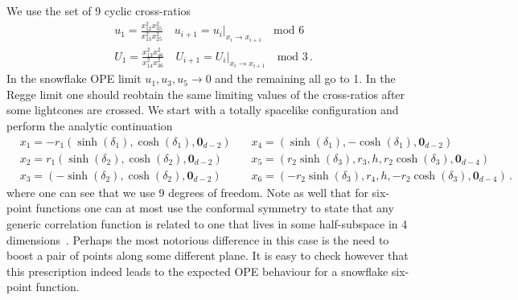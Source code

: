 We use the set of 9 cyclic cross-ratios
\begin{align}
   & u_1=\frac{x_{12}^2 x_{35}^2}{x_{13}^2 x_{25}^2} \quad u_{i+1}=u_i\vert_{x_i\to x_{i+1}} \quad \text{mod 6}\,\nonumber \\
   & U_1=\frac{x_{13}^2 x_{46}^2}{x_{14}^2 x_{36}^2}\quad U_{i+1}=U_i\vert_{x_i\to x_{i+1}} \quad \text{mod 3}\,.
\end{align}
In the snowflake OPE limit $u_1, u_3, u_5 \to 0$ and the remaining all go to 1. In the Regge limit one should reobtain the same limiting values of the cross-ratios after some lightcones are crossed. We start with a totally spacelike configuration and perform the analytic continuation
\begin{align}
  \label{eq:analyticcont6pt}
   & x_{1}= -r_1\left(\sinh(\delta_1),\cosh(\delta_1), \textbf{0}_{d-2} \right)\, &  & x_{4}= \left(\sinh(\delta_1), -\cosh(\delta_1), \textbf{0}_{d-2}\right)\,\nonumber \\
   & x_{2}= r_1\left(\sinh(\delta_2),\cosh(\delta_2), \textbf{0}_{d-2}\right)\,   &  & x_5=(r_2\sinh(\delta_3), r_3, h, r_2 \cosh(\delta_3),\textbf{0}_{d-4})\nonumber\,  \\
   & x_{3}= \left(-\sinh(\delta_2), \cosh(\delta_2), \textbf{0}_{d-2} \right)\,   &  & x_6=(-r_2 \sinh(\delta_3), r_4, h,- r_2 \cosh(\delta_3),\textbf{0}_{d-4})\,.
\end{align}
where one can see that we use 9 degrees of freedom. Note as well that for six-point functions one can at most use the conformal symmetry to state that any generic correlation function is related to one that lives in some half-subspace in 4 dimensions~\cite{Kravchuk:2016qvl}. Perhaps the most notorious difference in this case is the need to boost a pair of points along some different plane. It is easy to check however that this prescription indeed leads to the expected OPE behaviour for a snowflake six-point function.



\cleardoublepage
